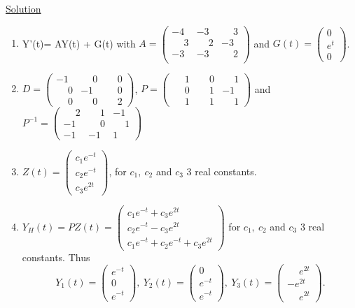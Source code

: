 \documentclass[11pt]{article}
\begin{document}
\begin{enumerate}
\underline{Solution}
\begin{enumerate}
\item Y'(t)= AY(t) + G(t) with $A= \begin{pmatrix} -4& -3& \phantom{-}3 \\ \phantom{-}3 & \phantom{-}2& -3 \\ -3& -3& \phantom{-}2\\ \end{pmatrix}$ and $G(t)=\begin{pmatrix} 0 \\ e^t \\0  \end{pmatrix}$.
\item  $D= \begin{pmatrix} -1& \phantom{-} 0 & \phantom{-} 0 \\ \phantom{-}0&-1 &\phantom{-}0 \\  \phantom{-}0&  \phantom{-}0&  \phantom{-}2 \end{pmatrix}$,   $P= \begin{pmatrix}  \phantom{-} 1& \phantom{-} 0 & \phantom{-} 1 \\ \phantom{-} 0 &  \phantom{-} 1 &  -1 \\  \phantom{-}1&  \phantom{-} 1&  \phantom{-} 1 \end{pmatrix}$ and $P^{-1}= \begin{pmatrix}  \phantom{-} 2&  \phantom{-} 1 &  -1 \\ - 1 &  \phantom{-} 0 &\phantom{-} 1\\ -1 &  -1  & 1 \end{pmatrix}$

\item $Z(t)= \begin{pmatrix} c_1e^{-t}\\c_2e^{-t}\\ c_3e^{2t} \end{pmatrix}$,  for  $c_1, \ c_2$ and $c_3$ 3 real constants.

\item $Y_H(t)=PZ(t)=\begin{pmatrix} c_1e^{-t}+c_3e^{2t} \\c_2e^{-t}-c_3e^{2t} \\c_1e^{-t}+c_2e^{-t}+c_3e^{2t}  \end{pmatrix}$ for $c_1, \ c_2$  and $c_3$ 3 real constants. Thus
\[
Y_1(t)=\begin{pmatrix} e^{-t}\\0\\e^{-t}\end{pmatrix}, \ Y_2(t)=\begin{pmatrix} 0 \\ e^{-t} \\ e^{-t} \end{pmatrix}, \ Y_3(t)=\begin{pmatrix} \phantom{-}e^{2t} \\ -e^{2t} \\  \phantom{-}e^{2t}  \end{pmatrix}.
\]


\end{enumerate}
\end{enumerate}
\end{document}
